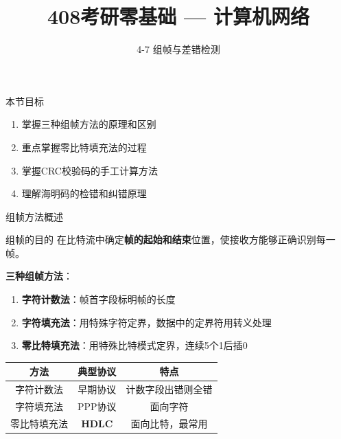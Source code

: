 \documentclass[10pt, aspectratio=169]{beamer}
\title{408考研零基础 --- 计算机网络}
\subtitle{4-7 组帧与差错检测}
\author{}
\date{}
\begin{document}
\begin{frame}{本节目标}
    \begin{enumerate}
        \item 掌握三种组帧方法的原理和区别
        \item 重点掌握零比特填充法的过程
        \item 掌握CRC校验码的手工计算方法
        \item 理解海明码的检错和纠错原理
    \end{enumerate}
\end{frame}

\begin{frame}{组帧方法概述}
    \begin{block}{组帧的目的}
        在比特流中确定\textbf{帧的起始和结束}位置，使接收方能够正确识别每一帧。
    \end{block}
    \vspace{0.3em}
    \textbf{三种组帧方法}：
    \begin{enumerate}
        \item \textbf{字符计数法}：帧首字段标明帧的长度
        \item \textbf{字符填充法}：用特殊字符定界，数据中的定界符用转义处理
        \item \textbf{零比特填充法}：用特殊比特模式定界，连续5个1后插0
    \end{enumerate}
    \vspace{0.5em}
    \begin{table}
        \begin{tabular}{|c|c|c|}
            \hline
            \textbf{方法} & \textbf{典型协议} & \textbf{特点} \\ \hline
            字符计数法 & 早期协议 & 计数字段出错则全错 \\
            字符填充法 & PPP协议 & 面向字符 \\
            零比特填充法 & \textbf{HDLC} & 面向比特，最常用 \\
            \hline
        \end{tabular}
    \end{table}
\end{frame}
\end{document}
